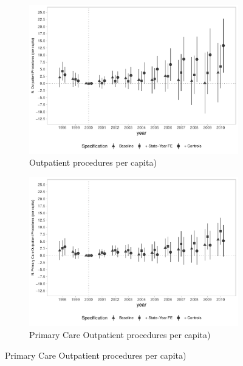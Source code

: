 \begin{figure}[h]
    \begin{center}
    \caption{Causal Effects on Ambulatorial Production}\label{fig:amb}
    \begin{subfigure}{0.32\textwidth}
        \caption{\scriptsize Outpatient procedures per capita)}\label{fig:amb_a}
        \centering
        \includegraphics[width=\textwidth]{plots/ambulatorial/sia_pcapita_dist_ec29_baseline_dist_ec29_baseline_full.pdf}
    \end{subfigure}
    \begin{subfigure}{0.32\textwidth}
        \centering
        \caption{\scriptsize Primary Care Outpatient procedures per capita)}\label{fig:amb_b}
        \includegraphics[width=\textwidth]{plots/ambulatorial/sia_ab_pcapita_dist_ec29_baseline_dist_ec29_baseline_full.pdf}

\end{subfigure}
\end{center}
\end{figure}

